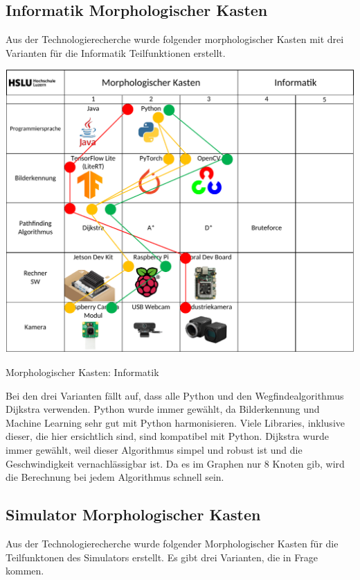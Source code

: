 \subsection{Informatik Morphologischer Kasten}

Aus der Technologierecherche wurde folgender morphologischer Kasten mit drei Varianten für die Informatik Teilfunktionen erstellt.

\begin{table}[H]
\centering
\includegraphics[width=\textwidth]{assets/MK_Informatik.pdf}
\caption{Morphologischer Kasten: Informatik}
\label{table:mk-informatik}
\end{table}


Bei den drei Varianten fällt auf, dass alle Python und den Wegfindealgorithmus Dijkstra verwenden. Python wurde immer gewählt, da Bilderkennung und Machine Learning sehr gut mit Python harmonisieren. Viele Libraries, inklusive dieser, die hier ersichtlich sind, sind kompatibel mit Python. Dijkstra wurde immer gewählt, weil dieser Algorithmus simpel und robust ist und die Geschwindigkeit vernachlässigbar ist. Da es im Graphen nur 8 Knoten gib, wird die Berechnung bei jedem Algorithmus schnell sein.

\subsection{Simulator Morphologischer Kasten}


Aus der Technologierecherche wurde folgender Morphologischer Kasten für die Teilfunktonen des Simulators erstellt. Es gibt drei Varianten, die in Frage kommen.

